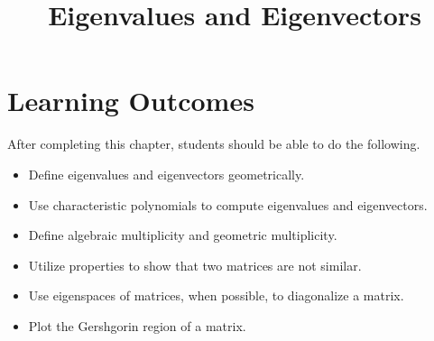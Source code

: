 \documentclass{ximera}
\title{Eigenvalues and Eigenvectors}
\begin{document}
\begin{abstract}

\end{abstract}
 
\maketitle
 
\section*{Learning Outcomes}
After completing this chapter, students should be able to do the following.
 
\begin{itemize}
    \item Define eigenvalues and eigenvectors geometrically.
    \item Use characteristic polynomials to compute eigenvalues and eigenvectors.
    \item Define algebraic multiplicity and geometric multiplicity.
    \item Utilize properties to show that two matrices are not similar.   
    \item Use eigenspaces of matrices, when possible, to diagonalize a matrix.
    \item Plot the Gershgorin region of a matrix.
\end{itemize}

 
\end{document}
